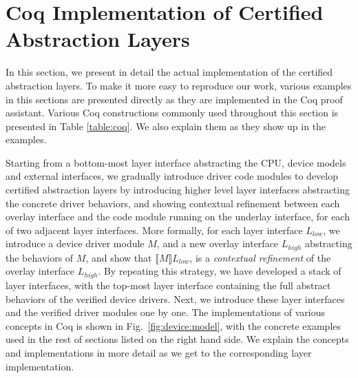 \section{Coq Implementation of Certified Abstraction Layers}
\label{sec:layers}

In this section, we present in detail the actual implementation of the
certified abstraction layers. To make it more easy to reproduce our work,
various examples in this sections are presented directly as they are
implemented in the Coq proof assistant. Various Coq constructions commonly
used throughout this section is presented in Table \ref{table:coq}.
We also explain them as they show up in the examples.

Starting from a bottom-most layer interface abstracting the CPU, device
models and external interfaces, we gradually introduce driver code modules
to develop certified abstraction layers by introducing higher level layer
interfaces abstracting the concrete driver behaviors, and showing contextual
refinement between each overlay interface and the code module running on
the underlay interface, for each of two adjacent layer interfaces.
More formally, for each layer interface $L_{low}$, we introduce a device driver module
$M$, and a new overlay interface $L_{high}$ abstracting the behaviors of $M$, and
show that $\llbracket{}M\rrbracket{}L_{low}$, is
a {\em contextual refinement} of the overlay interface $L_{high}$.
By repeating this strategy, we have developed a stack of layer interfaces,
with the top-most layer interface containing the full abstract behaviors of
the verified device drivers. Next, we introduce these layer interfaces and
the verified driver modules one by one. The implementations of various
concepts in Coq is shown in Fig.~\ref{fig:device:model}, with the concrete
examples used in the rest of sections listed on the right hand side.
We explain the concepts and implementations in more detail as we get to the
corresponding layer implementation.


